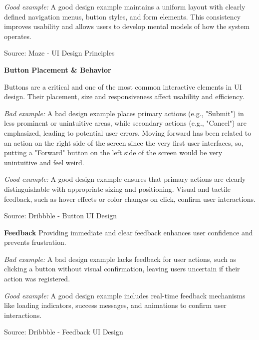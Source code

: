 \blankLine

\textit{Good example:}
A good design example maintains a uniform layout with clearly defined navigation menus, button styles, and form elements. This consistency improves usability and allows users to develop mental models of how the system operates.

\blankLine

Source: Maze - UI Design Principles

\blankLine

\textbf{Button Placement \& Behavior}

Buttons are a critical and one of the most common interactive elements in UI design. Their placement, size and responsiveness affect usability and efficiency.

\blankLine

\textit{Bad example:}
A bad design example places primary actions (e.g., "Submit") in less prominent or unintuitive areas, while secondary actions (e.g., "Cancel") are emphasized, leading to potential user errors. Moving forward has been related to an action on the right side of the screen since the very first user interfaces, so, putting a "Forward" button on the left side of the screen would be very unintuitive and feel weird. 

\blankLine

\textit{Good example:}
A good design example ensures that primary actions are clearly distinguishable with appropriate sizing and positioning. Visual and tactile feedback, such as hover effects or color changes on click, confirm user interactions.

\blankLine

Source: Dribbble - Button UI Design

\blankLine

\textbf{Feedback}
Providing immediate and clear feedback enhances user confidence and prevents frustration.

\blankLine

\textit{Bad example:}
A bad design example lacks feedback for user actions, such as clicking a button without visual confirmation, leaving users uncertain if their action was registered.

\blankLine

\textit{Good example:}
A good design example includes real-time feedback mechanisms like loading indicators, success messages, and animations to confirm user interactions.

\blankLine

Source: Dribbble - Feedback UI Design

